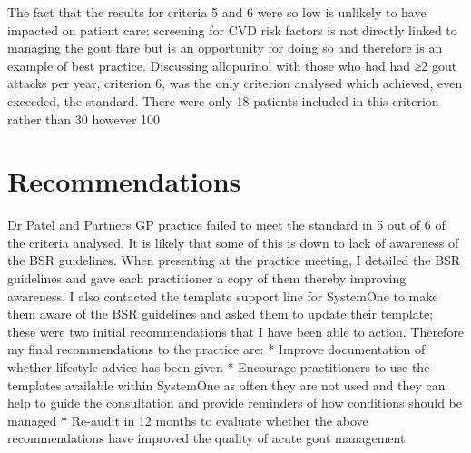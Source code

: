 \documentclass[paper=a4,fontsize=11pt,twocolumn]{article}
\begin{document}
The fact that the results for criteria 5 and 6 were so low is unlikely to have impacted on patient care; screening for CVD risk factors is not directly linked to managing the gout flare but is an opportunity for doing so and therefore is an example of best practice.
Discussing allopurinol with those who had had ≥2 gout attacks per year, criterion 6, was the only criterion analysed which achieved, even exceeded, the standard. There were only 18 patients included in this criterion rather than 30 however 100%



\section{Recommendations}
Dr Patel and Partners GP practice failed to meet the standard in 5 out of 6 of the criteria analysed. It is likely that some of this is down to lack of awareness of the BSR guidelines. 
When presenting at the practice meeting, I detailed the BSR guidelines and gave each practitioner a copy of them thereby improving awareness. I also contacted the template support line for SystemOne to make them aware of the BSR guidelines and asked them to update their template; these were two initial recommendations that I have been able to action. Therefore my final recommendations to the practice are:
*	Improve documentation of whether lifestyle advice has been given 
*	Encourage practitioners to use the templates available within SystemOne as often they are not used and they can help to guide the consultation and provide reminders of how conditions should be managed
*	Re-audit in 12 months to evaluate whether the above recommendations have improved the quality of acute gout management



\end{document}
